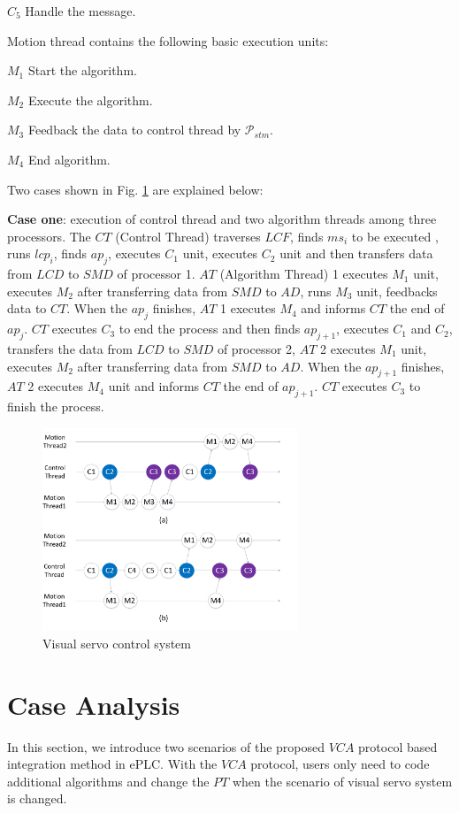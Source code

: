 \documentclass[journal,UTF8]{IEEEtran}
\begin{document}
\textbf{$C_{5}$} Handle the message.

Motion thread contains the following basic execution units:

\textbf{$M_{1}$} Start the algorithm.

\textbf{$M_{2}$} Execute the algorithm.

\textbf{$M_{3}$} Feedback the data to control thread by $\mathcal{P}_{stm}$.

\textbf{$M_{4}$} End algorithm.

Two cases shown in Fig. \ref{fig:threadFlow} are explained below:

\textbf{Case one}: execution of control thread and two algorithm threads among three processors. The $CT$ (Control Thread) traverses $LCF$, finds $ms_i$ to be executed , runs $lcp_i$, finds $ap_j$, executes $C_1$ unit, executes $C_2$ unit and then transfers data from $LCD$ to $SMD$ of processor 1. $AT$ (Algorithm Thread) 1 executes $M_1$ unit, executes $M_2$ after transferring data from $SMD$ to $AD$, runs $M_3$ unit, feedbacks data to $CT$. When the $ap_j$ finishes, $AT$ 1 executes $M_4$ and informs $CT$ the end of $ap_j$. $CT$ executes $C_3$ to end the process and then finds $ap_{j+1}$, executes $C_1$ and $C_2$, transfers the data from $LCD$ to $SMD$ of processor 2, $AT$ 2 executes $M_1$ unit, executes $M_2$ after transferring data from $SMD$ to $AD$. When the $ap_{j+1}$ finishes, $AT$ 2 executes $M_4$ unit and informs $CT$ the end of $ap_{j+1}$. $CT$ executes $C_3$ to finish the process.
\begin{figure}
	\centering
	\includegraphics[width=3in]{fig/threadflow.pdf}
	\caption{ Visual servo control system}
	\label{fig:threadFlow}
\end{figure}

\section{Case Analysis}
\label{Case}
In this section, we introduce two scenarios of the proposed $VCA$ protocol based integration method in ePLC. With the $VCA$ protocol, users only need to code additional algorithms and change the $PT$ when the scenario of visual servo system is changed. 
\end{document}
